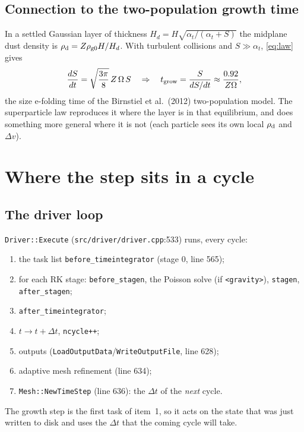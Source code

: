 \documentclass[11pt]{article}
\newcommand{\code}[1]{\texttt{#1}}
\newcommand{\file}[1]{\texttt{\small #1}}
\newcommand{\fn}[1]{\texttt{\small #1}}
\newcommand{\St}{S}
\newcommand{\rhod}{\rho_{\rm d}}
\begin{document}
\subsection{Connection to the two-population growth time}
In a settled Gaussian layer of thickness $H_d=H\sqrt{\alpha_t/(\alpha_t+\St)}$ the
midplane dust density is $\rhod=Z\rho_{\rm g0}H/H_d$. With turbulent collisions and
$\St\gg\alpha_t$, \eqref{eq:law} gives
\begin{equation}
  \frac{d\St}{dt}=\sqrt{\frac{3\pi}{8}}\,Z\,\Omega\,\St
  \quad\Rightarrow\quad
  t_{\rm grow}=\frac{\St}{d\St/dt}\approx\frac{0.92}{Z\Omega},
\end{equation}
the size e-folding time of the Birnstiel et al.\ (2012) two-population model. The
superparticle law reproduces it where the layer is in that equilibrium, and does
something more general where it is not (each particle sees its own local $\rhod$ and
$\Delta v$).

\section{Where the step sits in a cycle}\label{sec:loop}

\subsection{The driver loop}
\fn{Driver::Execute} (\file{src/driver/driver.cpp}:533) runs, every cycle:
\begin{enumerate}
\item the task list \code{before\_timeintegrator} (stage 0, line 565);
\item for each RK stage: \code{before\_stagen}, the Poisson solve (if
  \code{<gravity>}), \code{stagen}, \code{after\_stagen};
\item \code{after\_timeintegrator};
\item $t\to t+\Delta t$, \code{ncycle++};
\item outputs (\fn{LoadOutputData}/\fn{WriteOutputFile}, line 628);
\item adaptive mesh refinement (line 634);
\item \fn{Mesh::NewTimeStep} (line 636): the $\Delta t$ of the \emph{next} cycle.
\end{enumerate}
The growth step is the first task of item~1, so it acts on the state that was just
written to disk and uses the $\Delta t$ that the coming cycle will take.
\end{document}
